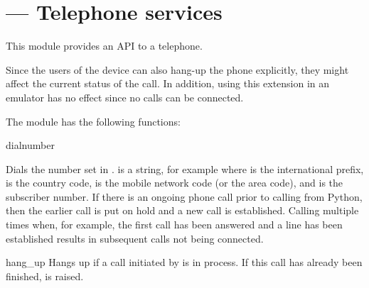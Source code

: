 %
%
%

\section{ ---
	 Telephone services}
\label{sec:telephone}


This module provides an API to a telephone. 

Since the users of the device can also hang-up the phone explicitly, they 
might affect the current status of the call. In addition, using this 
extension in an emulator has no effect since no calls can be connected.

The  module has the following functions:

\begin{funcdesc}{dial}{number}

Dials the number set in .  
is a string, for example  where  is the 
international prefix,  is the country code,  is 
the mobile network code (or the area code), and  is the 
subscriber number. If there is an ongoing phone call prior to calling 
 from Python, then the earlier call is put on hold and a new 
call is established. Calling  multiple times when, for example, 
the first call has been answered and a line has been established results in 
subsequent calls not being connected.
\end{funcdesc}

\begin{funcdesc}{hang\_up}{}
Hangs up if a call initiated by  is in process. If this call 
has already been finished,  is raised.
\end{funcdesc}

